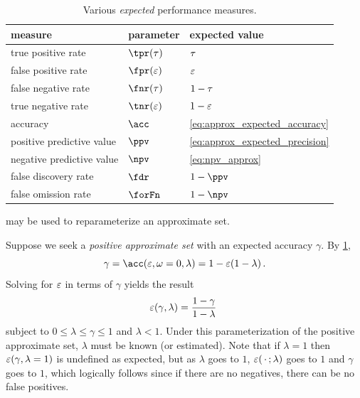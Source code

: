 \documentclass[10pt,final,hidelinks]{article}
\numberwithin{equation}{section}
\begin{document}
\begin{table}
	\centering
	\caption{Various \emph{expected} performance measures.}
	\label{tbl:perf_sum}    
	\begin{tabular}{@{} l l l @{}}
		\toprule
		\textbf{measure} & \textbf{parameter} & \textbf{expected value}\\
		\midrule
		true positive rate & $\tpr(\tprate)$ & $\tau$\\
		false positive rate & $\fpr(\fprate)$ & $\varepsilon$\\
		false negative rate & $\fnr(\tprate)$ & $1-\tau$\\
		true negative rate & $\tnr(\fprate)$ & $1-\varepsilon$\\
		accuracy & $\acc$ & \cref{eq:approx_expected_accuracy}\\        
		positive predictive value & $\ppv$ & \cref{eq:approx_expected_precision}\\
		negative predictive value & $\npv$ & \cref{eq:npv_approx}\\        
		false discovery rate & $\fdr$ & $1-\ppv$\\
		false omission rate & $\forFn$ & $1-\npv$\\
		\bottomrule
	\end{tabular}
\end{table}
 may be used to reparameterize an approximate set.
\begin{example}
	Suppose we seek a \emph{positive approximate set} with an expected accuracy 
	$\gamma$. By \cref{tbl:perf_sum},
	\begin{equation}
	\gamma = \acc(\fprate,\fnrate=0,\lambda) = 1 - \fprate(1 - \lambda)\,.
	\end{equation}
	Solving for $\varepsilon$ in terms of $\gamma$ yields the result
	\begin{equation}
	\varepsilon(\gamma, \lambda) = \frac{1 - \gamma}{1 - 
		\lambda}\
	\end{equation}
	subject to $0 \leq \lambda \leq \gamma \leq 1$ and $\lambda < 1$.
	Under this parameterization of the 	positive approximate set, $\lambda$ 
	must be known (or estimated).
	Note that if $\lambda = 1$ then $\varepsilon(\gamma, \lambda=1)$ is undefined as expected, but as $\lambda$ goes to $1$, $\varepsilon(\,\cdot\,; \lambda)$ goes to $1$ and $\gamma$ goes to $1$, which logically follows since if there are no negatives, there can be no false positives.
\end{example}
\end{document}
